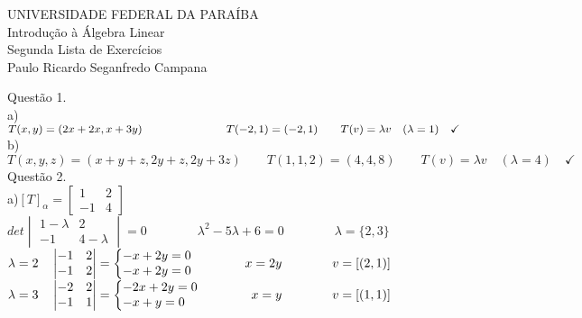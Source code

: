 \documentclass[12pt]{article}
\begin{document}
\begin{center}
	UNIVERSIDADE FEDERAL DA PARAÍBA\\
	Introdução à Álgebra Linear\\
	Segunda Lista de Exercícios\\
	Paulo Ricardo Seganfredo Campana\\
\end{center}

\noindent Questão 1.\\

\noindent a) $T(x,y)=(2x+2x,x+3y)\qquad\qquad\qquad\text{\hspace{+14pt}}T(-2,1)=(-2,1)\qquad T(v)=\lambda v\quad(\lambda=1)\quad\checkmark$\\

\noindent b) $T(x,y,z)=(x+y+z,2y+z,2y+3z)\qquad T(1,1,2)=(4,4,8)\qquad T(v)=\lambda v\quad(\lambda=4)\quad\checkmark$\\

\noindent Questão 2.\\

\noindent a)\quad$[T]_{\alpha}=\begin{bmatrix}1&2\\-1&4\end{bmatrix}$\\

$det\begin{vmatrix}1-\lambda&2\\-1&4-\lambda\end{vmatrix}=0\qquad\qquad\lambda^{2}-5\lambda+6=0\qquad\qquad\lambda=\lbrace2,3\rbrace$\\

$\lambda=2\quad\begin{vmatrix}-1&2\\-1&2\end{vmatrix}=\left\{\begin{array}{@{}l@{}}-x+2y=0\\-x+2y=0\end{array}\right.\qquad\qquad x=2y\qquad\qquad v=[(2,1)]$\\

$\lambda=3\quad\begin{vmatrix}-2&2\\-1&1\end{vmatrix}=\left\{\begin{array}{@{}l@{}}-2x+2y=0\\-x+y=0\end{array}\right.\qquad\qquad x=y\qquad\qquad v=[(1,1)]$\\
\end{document}
